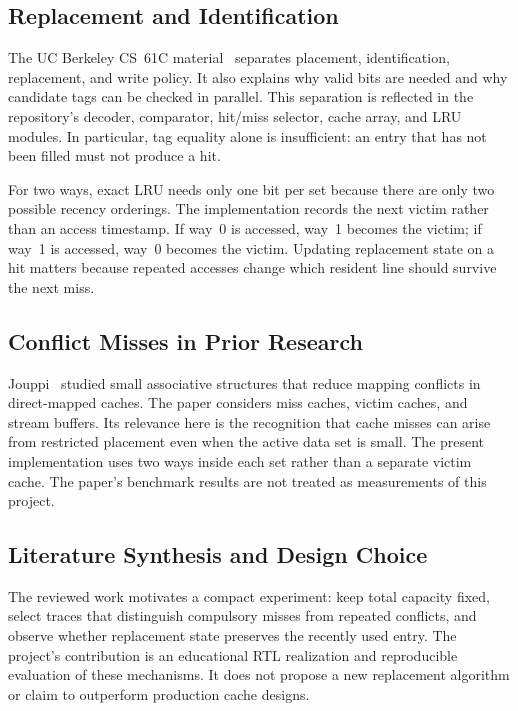 \documentclass[conference]{IEEEtran}
\begin{document}
\subsection{Replacement and Identification}

The UC Berkeley CS~61C material~\cite{berkeley} separates placement,
identification, replacement, and write policy. It also explains why
valid bits are needed and why candidate tags can be checked in parallel.
This separation is reflected in the repository's decoder, comparator,
hit/miss selector, cache array, and LRU modules. In particular, tag
equality alone is insufficient: an entry that has not been filled must
not produce a hit.

For two ways, exact LRU needs only one bit per set because there are
only two possible recency orderings. The implementation records the
next victim rather than an access timestamp. If way~0 is accessed,
way~1 becomes the victim; if way~1 is accessed, way~0 becomes the
victim. Updating replacement state on a hit matters because repeated
accesses change which resident line should survive the next miss.

\subsection{Conflict Misses in Prior Research}

Jouppi~\cite{jouppi} studied small associative structures that reduce
mapping conflicts in direct-mapped caches. The paper considers miss
caches, victim caches, and stream buffers. Its relevance here is the
recognition that cache misses can arise from restricted placement even
when the active data set is small. The present implementation uses two
ways inside each set rather than a separate victim cache. The paper's
benchmark results are not treated as measurements of this project.

\subsection{Literature Synthesis and Design Choice}

The reviewed work motivates a compact experiment: keep total capacity
fixed, select traces that distinguish compulsory misses from repeated
conflicts, and observe whether replacement state preserves the recently
used entry. The project's contribution is an educational RTL
realization and reproducible evaluation of these mechanisms. It does
not propose a new replacement algorithm or claim to outperform
production cache designs.
\end{document}
